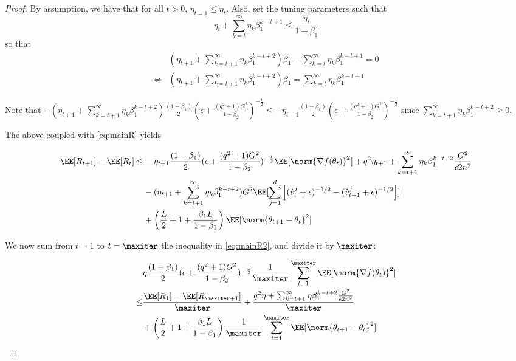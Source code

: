\documentclass[11pt]{article}
\begin{document}
\begin{proof}
By assumption, we have that for all $t >0$, $\eta_{t=1} \leq \eta_t$.
Also, set the tuning parameters such that
\begin{equation}
 \eta_{t}+ \sum_{k=t}^\infty \eta_{k} \beta_1^{k-t+1} \leq \frac{\eta_t}{1 - \beta_1}
 \end{equation}
 so that 
\begin{equation}
\begin{split}
& (\eta_{t+1} + \sum_{k=t+1}^\infty \eta_{k} \beta_1^{k-t+2}) \beta_1- \sum_{k=t}^\infty \eta_{k} \beta_1^{k-t+1} = 0\\
\iff& (\eta_{t+1} + \sum_{k=t+1}^\infty \eta_{k} \beta_1^{k-t+2}) \beta_1 = \sum_{k=t}^\infty \eta_{k} \beta_1^{k-t+1}
\end{split}
\end{equation}

Note that $- (\eta_{t+1}+ \sum_{k=t+1}^\infty \eta_{k} \beta_1^{k-t+2})\frac{(1-\beta_1)}{2}  (\epsilon + \frac{(q^2+1)G^2}{1 - \beta_2})^{-\frac{1}{2}}\leq - \eta_{t+1}\frac{(1-\beta_1)}{2} (\epsilon + \frac{(q^2+1)G^2}{1 - \beta_2})^{-\frac{1}{2}}$ since $ \sum_{k=t+1}^\infty \eta_{k} \beta_1^{k-t+2} \geq 0$.

The above coupled with \eqref{eq:mainR} yields

\begin{equation}\label{eq:mainR2}
\begin{split}
\EE[R_{t+1}] - \EE[R_t] \leq & - \eta_{t+1}\frac{(1-\beta_1)}{2} (\epsilon + \frac{(q^2+1)G^2}{1 - \beta_2})^{-\frac{1}{2}} \EE[\norm{\nabla f(\theta_t)}^2]+q^2 \eta_{t+1}+ \sum_{k=t+1}^\infty \eta_{k} \beta_1^{k-t+2}\frac{G^2 }{\epsilon 2n^2}\\
&  -  (\eta_{t+1}+ \sum_{k=t+1}^\infty \eta_{k} \beta_1^{k-t+2}) G^2 \EE[\sum_{j=1}^d \left[(\hat{v}^j_{t} + \epsilon )^{-1/2} - (\hat{v}^j_{t+1} + \epsilon )^{-1/2}  \right] ]\\
& + \left(\frac{L}{2} + 1+ \frac{\beta_1L}{1-\beta_1} \right)  \EE[ \norm{\theta_{t+1} - \theta_{t}}^2]
\end{split}
\end{equation}

We now sum from $t = 1$ to $t = \maxiter$  the inequality in \eqref{eq:mainR2}, and divide it by $\maxiter$:

\begin{equation}\label{eq:finalR2}
\begin{split}
&\eta\frac{(1-\beta_1)}{2} (\epsilon + \frac{(q^2+1)G^2}{1 - \beta_2})^{-\frac{1}{2}} \frac{1}{\maxiter}\sum_{t=1}^{\maxiter} \EE[\norm{\nabla f(\theta_t)}^2] \\
\leq & \frac{\EE[R_1] - \EE[R_{\maxiter+1}]}{\maxiter} + \frac{q^2 \eta+ \sum_{k=t+1}^\infty \eta \beta_1^{k-t+2}\frac{G^2 }{\epsilon 2n^2}}{\maxiter}\\
& + \left(\frac{L}{2} + 1+ \frac{\beta_1L}{1-\beta_1} \right)\frac{1}{\maxiter}  \sum_{t=1}^{\maxiter}\EE[ \norm{\theta_{t+1} - \theta_{t}}^2]
\end{split}
\end{equation}


\end{proof}
\end{document}

